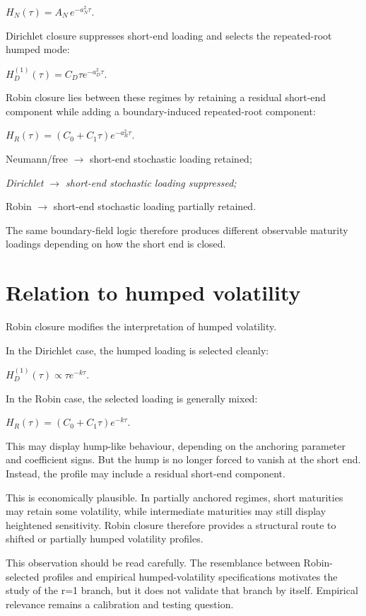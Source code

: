 \documentclass[11pt,oneside]{book}
\begin{document}
$H_N(\tau)=A_N\,e^{-a_N^2\tau}$.

Dirichlet closure suppresses short-end loading and selects the
repeated-root humped mode:

$H_D^{(1)}(\tau)=C_D\tau e^{-a_D^2\tau}$.

Robin closure lies between these regimes by retaining a residual
short-end component while adding a boundary-induced repeated-root
component:

$H_R(\tau)=(C_0+C_1\tau)e^{-a_R^2\tau}$.

Neumann/free $\to$ short-end stochastic loading retained;

\begin{center}\emph{Dirichlet \(\to\) short-end stochastic loading suppressed;}\end{center}

Robin $\to$ short-end stochastic loading partially retained.

The same boundary-field logic therefore produces different observable
maturity loadings depending on how the short end is closed.

\section{Relation to humped
volatility}\label{relation-to-humped-volatility}

Robin closure modifies the interpretation of humped volatility.

In the Dirichlet case, the humped loading is selected cleanly:

$H_D^{(1)}(\tau)\propto\tau e^{-k\tau}$.

In the Robin case, the selected loading is generally mixed:

$H_R(\tau)=(C_0+C_1\tau)e^{-k\tau}$.

This may display hump-like behaviour, depending on the anchoring
parameter and coefficient signs. But the hump is no longer forced to
vanish at the short end. Instead, the profile may include a residual
short-end component.

This is economically plausible. In partially anchored regimes, short
maturities may retain some volatility, while intermediate maturities may
still display heightened sensitivity. Robin closure therefore provides a
structural route to shifted or partially humped volatility profiles.

This observation should be read carefully. The resemblance between
Robin-selected profiles and empirical humped-volatility specifications
motivates the study of the r=1 branch, but it does not validate that
branch by itself. Empirical relevance remains a calibration and testing
question.
\end{document}
